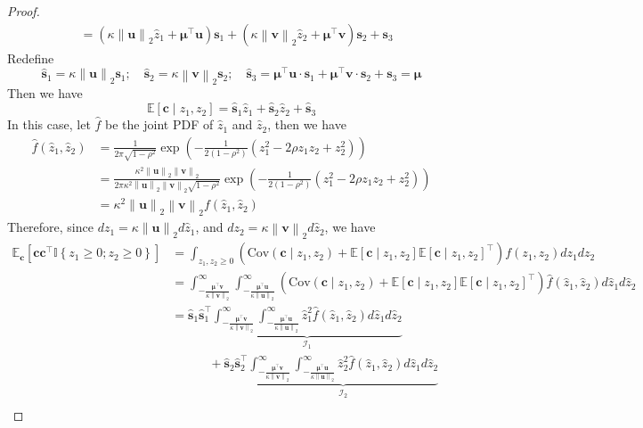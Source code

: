 \documentclass[10pt,a4paper]{amsart}
\def\bfc{{\mathbf{c}}}\def\bfd{{\mathbf{d}}}
\def\bfs{{\mathbf{s}}}\def\bft{{\mathbf{t}}}
\def\bfu{{\mathbf{u}}}\def\bfv{{\mathbf{v}}}\def\bfw{{\mathbf{w}}}\def\bfx{{\mathbf{x}}}
\def\bfv{{\mathbf{v}}}\def\bfw{{\mathbf{w}}}\def\bfx{{\mathbf{x}}}
\newcommand{\norm}[1]{\left\|#1\right\|}
\newcommand{\paren}[1]{\left(#1\right)}
\providecommand{\E}{\mathbb{E}}
\begin{document}
\begin{proof}
\begin{align*}
        & = \paren{\kappa\norm{\bfu}_2\hat{z}_1 + \bm{\mu}^\top\bfu}\bfs_1 + \paren{\kappa\norm{\bfv}_2\hat{z}_2 + \bm{\mu}^\top\bfv}\bfs_2 + \bfs_3
    \end{align*}
    Redefine
    \[
        \hat{\bfs}_1 = \kappa\norm{\bfu}_2\bfs_1;\quad\hat{\bfs}_2 = \kappa\norm{\bfv}_2\bfs_2;\quad\hat{\bfs}_3 = \bm{\mu}^\top\bfu\cdot\bfs_1 + \bm{\mu}^\top\bfv\cdot\bfs_2 + \bfs_3 = \bm{\mu}
    \]
    Then we have
    \[
        \E[\bfc\mid z_1,z_2] = \hat{\bfs}_1\hat{z}_1+\hat{\bfs}_2\hat{z}_2 + \hat{\bfs}_3
    \]
    In this case, let $\hat{f}$ be the joint PDF of $\hat{z}_1$ and $\hat{z}_2$, then we have
    \begin{align*}
        \hat{f}\paren{\hat{z}_1,\hat{z}_2} & = \frac{1}{2\pi\sqrt{1 - \rho^2}}\exp\paren{-\frac{1}{2(1-\rho^2)}\paren{z_1^2 - 2\rho z_1z_2 + z_2^2}}\\
        & = \frac{\kappa^2\norm{\bfu}_2\norm{\bfv}_2}{2\pi\kappa^2\norm{\bfu}_2\norm{\bfv}_2\sqrt{1-\rho^2}}\exp\paren{- 
     \frac{1}{2(1-\rho^2)}\paren{z_1^2 - 2\rho z_1z_2 + z_2^2}}\\
        & = \kappa^2\norm{\bfu}_2\norm{\bfv}_2f\paren{\hat{z}_1,\hat{z}_2}
    \end{align*}
    Therefore, since $dz_1 = \kappa\norm{\bfu}_2d\hat{z}_1$, and $dz_2 = \kappa\norm{\bfv}_2d\hat{z}_2$, we have
    \begin{align*}
        \E_{\bfc}\left[\bfc\bfc^\top\mathbb{I}\left\{z_1\geq 0;z_2\geq 0\right\}\right] & = \int_{z_1,z_2\geq 0}\paren{\text{Cov}\paren{\bfc\mid z_1,z_2} + \E[\bfc\mid z_1,z_2]\E[\bfc\mid z_1,z_2]^\top}f(z_1,z_2)dz_1dz_2\\
        & = \int_{-\frac{\bm{\mu}^\top\bfv}{\kappa\norm{\bfv}_2}}^\infty\int_{-\frac{\bm{\mu}^\top\bfu}{\kappa\norm{\bfu}_2}}^\infty\paren{\text{Cov}\paren{\bfc\mid z_1,z_2} + \E[\bfc\mid z_1,z_2]\E[\bfc\mid z_1,z_2]^\top}\hat{f}(\hat{z}_1,\hat{z}_2)d\hat{z}_1d\hat{z}_2\\
        & = \hat{\bfs}_1\hat{\bfs}_1^\top\underbrace{\int_{-\frac{\bm{\mu}^\top\bfv}{\kappa\norm{\bfv}_2}}^\infty\int_{-\frac{\bm{\mu}^\top\bfu}{\kappa\norm{\bfu}_2}}^\infty\hat{z}_1^2\hat{f}(\hat{z}_1,\hat{z}_2)d\hat{z}_1d\hat{z}_2}_{\mathcal{I}_1}\\
        & \quad\quad\quad + \hat{\bfs}_2\hat{\bfs}_2^\top\underbrace{\int_{-\frac{\bm{\mu}^\top\bfv}{\kappa\norm{\bfv}_2}}^\infty\int_{-\frac{\bm{\mu}^\top\bfu}{\kappa\norm{\bfu}_2}}^\infty\hat{z}_2^2\hat{f}(\hat{z}_1,\hat{z}_2)d\hat{z}_1d\hat{z}_2}_{\mathcal{I}_2}\\

\end{align*}
\end{proof}
\end{document}
